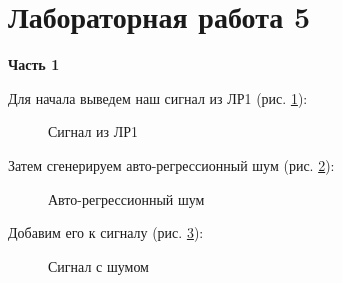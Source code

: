 \documentclass[a4paper,oneside,14pt]{extreport}
\begin{document}


\chapter*{Лабораторная работа 5}

\textbf{Часть 1}

Для начала выведем наш сигнал из ЛР1 (рис. \ref{task1_signal}):
\begin{figure}[!h]
	\caption{Сигнал из ЛР1}
	\label{task1_signal}
\end{figure}

Затем сгенерируем авто-регрессионный шум (рис. \ref{task1_noise}):
\begin{figure}[!h]
	\caption{Авто-регрессионный шум}
	\label{task1_noise}
\end{figure}

\newpage
Добавим его к сигналу  (рис. \ref{task1_signal_noise}):
\begin{figure}[!h]
	\caption{Сигнал с шумом}
	\label{task1_signal_noise}
\end{figure}
\end{document}
